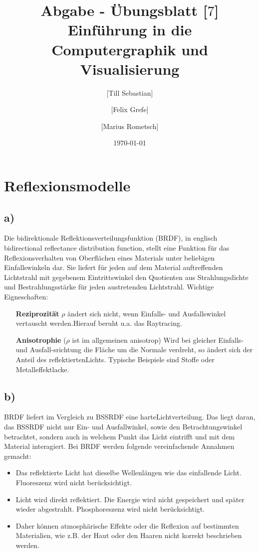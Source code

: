 \documentclass[10pt,a4paper]{article}
\begin{document}
\title{Abgabe - Übungsblatt [$7$]\\
\small{Einführung in die Computergraphik und Visualisierung}}
\author{ [Till Sebastian] \and [Felix Grefe] \and [Marius Rometsch]}
\date{\today}
\maketitle



\section*{Reflexionsmodelle}
\subsection*{a)}
Die bidirektionale Reflektionsverteilungsfunktion (BRDF), in englisch  \glqq bidirectional reflectance distribution function\grqq, stellt eine Funktion für das Reflexionsverhalten von Oberflächen eines Materials unter beliebigen Einfallswinkeln dar. Sie liefert für jeden auf dem Material auftreffenden Lichtstrahl mit gegebenem Eintrittswinkel den Quotienten aus Strahlungsdichte und Bestrahlungsstärke für jeden austretenden Lichtstrahl. Wichtige Eigneschaften:
\begin{itemize}
\item[\textbf{Reziprozität}] $\rho$ ändert sich nicht, wenn Einfalls- und Ausfallswinkel vertauscht werden.Hierauf beruht u.a. das Raytracing.
\item[\textbf{Anisotrophie}] ($\rho$ ist im allgemeinen anisotrop) Wird bei gleicher Einfalls- und Ausfall-srichtung die Fläche um die Normale verdreht, so ändert sich der Anteil des reflektiertenLichts. Typische Beispiele sind Stoffe oder Metalleffektlacke.
\end{itemize}

\subsection*{b)}
BRDF liefert im Vergleich zu BSSRDF eine \glqq harte\grqq Lichtverteilung. Das liegt daran, das BSSRDF nicht nur Ein- und Ausfallwinkel, sowie den Betrachtungswinkel betrachtet, sondern auch in welchem Punkt das Licht eintrifft und mit dem Material interagiert. Bei BRDF werden folgende vereinfachende Annahmen gemacht:

\begin{itemize}
\item Das reflektierte Licht hat dieselbe Wellenlängen wie das einfallende Licht. Fluoreszenz wird nicht berücksichtigt.
\item Licht wird direkt reflektiert.  Die Energie wird nicht gespeichert und später wieder abgestrahlt. Phosphoreszenz wird nicht berücksichtigt.
\item Daher können atmosphärische Effekte oder die Reflexion auf bestimmten Materialien, wie z.B. der Haut oder den Haaren nicht korrekt beschrieben werden.
\end{itemize}
\end{document}

